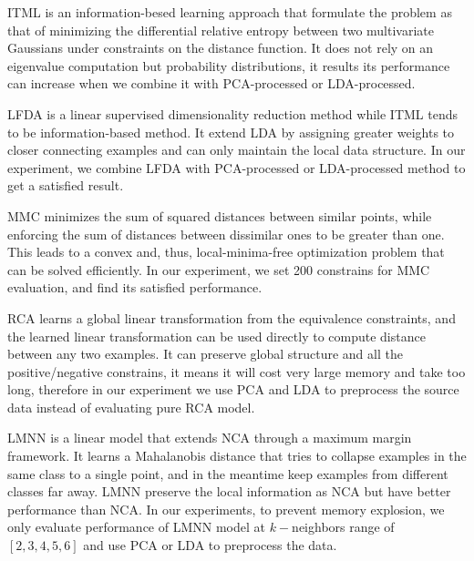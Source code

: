 \documentclass[conference]{IEEEtran}
\begin{document}
ITML is an information-besed learning approach that formulate the problem as that of minimizing the differential relative entropy between two multivariate Gaussians under constraints on the distance function\cite{Davis2007Information}. It does not rely on an eigenvalue computation but probability distributions, it results its performance can increase when we combine it with PCA-processed or LDA-processed.

LFDA is a linear supervised dimensionality reduction method while ITML tends to be information-based method. It extend LDA by assigning greater weights to closer connecting examples and can only maintain the local data structure. In our experiment, we combine LFDA with PCA-processed or LDA-processed method to get a satisfied result.

MMC minimizes the sum of squared distances between similar points, while enforcing the sum of distances between dissimilar ones to be greater than one. This leads to a convex and, thus, local-minima-free optimization problem that can be solved efficiently. In our experiment, we set 200 constrains for MMC evaluation, and find its satisfied performance.

RCA learns a global linear transformation from the equivalence constraints, and the learned linear transformation can be used directly to compute distance between any two examples. It can preserve global structure and all the positive/negative constrains, it means it will cost very large memory and take too long, therefore in our experiment we use PCA and LDA to preprocess the source data instead of evaluating pure RCA model.

LMNN is a linear model that extends NCA through a maximum margin framework. It learns a Mahalanobis distance that tries to collapse examples in the same class to a single point, and in the meantime keep examples from different classes far away. LMNN preserve the local information as NCA but have better performance than NCA. In our experiments, to prevent memory explosion, we only evaluate performance of LMNN model at $k-$neighbors range of $[2,3,4,5,6]$ and use PCA or LDA to preprocess the data.
\end{document}
